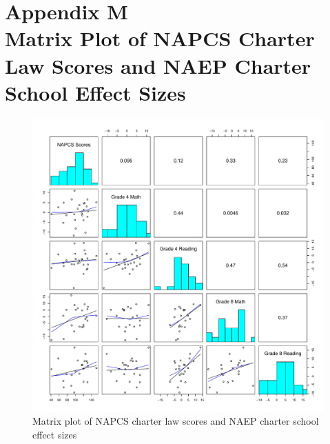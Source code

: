 {}
\section*{Appendix M\\Matrix Plot of NAPCS Charter Law Scores and NAEP Charter School Effect Sizes}


\begin{figure}[h!]
\begin{center}
\includegraphics[width=\textwidth]{../Figures2009/NAEPLawScoresMatrixPlot.pdf}
\caption{Matrix plot of NAPCS charter law scores and NAEP charter school effect sizes}
\end{center}
\end{figure}





